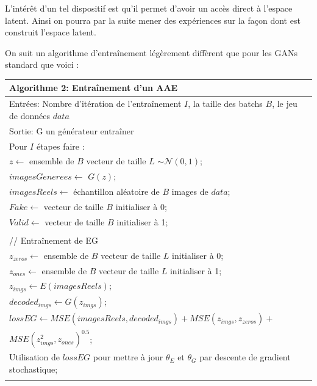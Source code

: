 \documentclass[11pt,francais]{article}
\begin{document}
L'intérêt d'un tel dispositif est qu'il permet d'avoir un accès direct à l'espace latent. Ainsi on pourra par la suite mener des expériences sur la façon dont est construit l'espace latent.


On suit un algorithme d'entraînement légèrement diffèrent que pour les GANs standard que voici :\\
\newpage
\begin{table}[t!]
  \begin{tabular}{l}
  \hline
  Algorithme 2: Entraînement d'un AAE\tabularnewline
  \hline
  Entrées: Nombre d'itération de l'entraînement  \(I\), la taille des batchs \(B\), le jeu de données \(data\)  \tabularnewline
  Sortie: G un générateur entraîner \tabularnewline
  \hline
  Pour \(I\) étapes faire :\tabularnewline 
  \hspace{1cm}\(z \leftarrow\) ensemble de \(B\) vecteur de taille \(L\) \(\sim \mathcal{N}(0,1)\);\tabularnewline
  \hspace{1cm}\(imagesGenerees \leftarrow\) \(G(z)\);\tabularnewline  
  \hspace{1cm}\(imagesReels \leftarrow\) échantillon aléatoire de \(B\) images de \(data\);\tabularnewline
  \hspace{1cm}\(Fake \leftarrow\) vecteur de taille \(B\) initialiser à 0;\tabularnewline
  \hspace{1cm}\(Valid \leftarrow\) vecteur de taille \(B\) initialiser à 1;\tabularnewline
  \tabularnewline
  
  \hspace{1cm}// Entraînement de EG\tabularnewline
  \hspace{1cm}\(z_{zeros} \leftarrow\) ensemble de \(B\) vecteur de taille \(L\) initialiser à 0;\tabularnewline
  \hspace{1cm}\(z_{ones} \leftarrow\) ensemble de \(B\) vecteur de taille \(L\) initialiser à 1;\tabularnewline
  \hspace{1cm}\(z_{imgs} \leftarrow E(imagesReels)\);\tabularnewline
  \hspace{1cm}\(decoded_{imgs} \leftarrow G(z_{imgs})\);\tabularnewline
  \hspace{1cm}\(lossEG \leftarrow MSE(imagesReels, decoded_{imgs}) + MSE(z_{imgs}, z_{zeros}) +\)\tabularnewline
  \hspace{2,8cm}\(MSE(z_{imgs}^2, z_{ones})^{0.5}\);\tabularnewline
  \hspace{1cm}Utilisation de \(lossEG\) pour mettre à jour \(\theta_E\) et \(\theta_G\) par descente de gradient stochastique;\tabularnewline
  \tabularnewline
  

\end{tabular}
\end{table}
\end{document}
